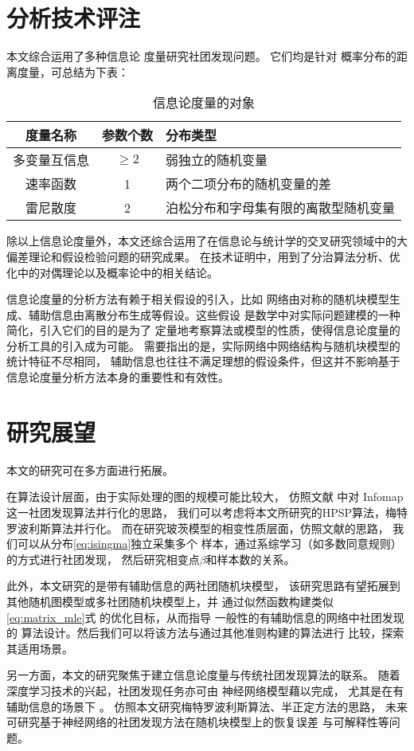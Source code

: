 \section{分析技术评注}
本文综合运用了多种信息论
度量研究社团发现问题。
它们均是针对
概率分布的距离度量，可总结为下表：
\begin{table}[!ht]
    \centering
  \begin{tabular}{ccp{8cm}}
    \hline
     度量名称    &   参数个数 &   分布类型 \\
    \hline
     多变量互信息 &    $\geq 2$ &    弱独立的随机变量  \\
     速率函数     &    1 &     两个二项分布的随机变量的差  \\
     雷尼散度     &    2 &    泊松分布和字母集有限的离散型随机变量 \\
    \hline
  \end{tabular}
  \caption{信息论度量的对象}\label{tab:info_metric}
\end{table}

除以上信息论度量外，本文还综合运用了在信息论与统计学的交叉研究领域中的大偏差理论和假设检验问题的研究成果。
在技术证明中，用到了分治算法分析、优化中的对偶理论以及概率论中的相关结论。

信息论度量的分析方法有赖于相关假设的引入，比如
网络由对称的随机块模型生成、辅助信息由离散分布生成等假设。这些假设
是数学中对实际问题建模的一种简化，引入它们的目的是为了
定量地考察算法或模型的性质，使得信息论度量的分析工具的引入成为可能。
需要指出的是，实际网络中网络结构与随机块模型的统计特征不尽相同，
辅助信息也往往不满足理想的假设条件，但这并不影响基于信息论度量分析方法本身的重要性和有效性。

\section{研究展望}
本文的研究可在多方面进行拓展。

在算法设计层面，由于实际处理的图的规模可能比较大，
仿照文献  中对 Infomap 这一社团发现算法并行化的思路，
我们可以考虑将本文所研究的HPSP算法，梅特罗波利斯算法并行化。
而在研究玻茨模型的相变性质层面，仿照文献的思路，
我们可以从分布\eqref{eq:isingma}独立采集多个
样本，通过系综学习（如多数同意规则）的方式进行社团发现，
然后研究相变点$\beta$和样本数的关系。

此外，本文研究的是带有辅助信息的两社团随机块模型，
该研究思路有望拓展到其他随机图模型或多社团随机块模型上，并
通过似然函数构建类似\eqref{eq:matrix_mle}式
的优化目标，从而指导
一般性的有辅助信息的网络中社团发现的
算法设计。然后我们可以将该方法与通过其他准则\cite{chunaev2020community}构建的算法进行
比较，探索其适用场景。

另一方面，本文的研究聚焦于建立信息论度量与传统社团发现算法的联系。
随着深度学习技术的兴起，社团发现任务亦可由
神经网络模型藉以完成\cite{Su_2022}，
尤其是在有辅助信息的场景下 \cite{cao2018incorporating}。
仿照本文研究梅特罗波利斯算法、半正定方法的思路，
未来可研究基于神经网络的社团发现方法在随机块模型上的恢复误差
与可解释性等问题。
